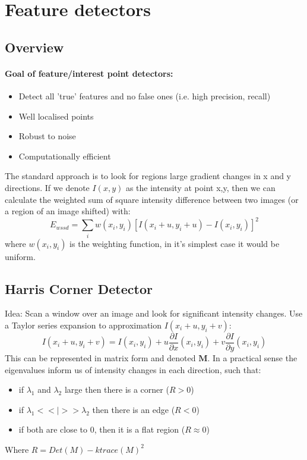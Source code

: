 \documentclass[]{article}
\begin{document}
\section{Feature detectors}
	\subsection{Overview}
	\paragraph{Goal of feature/interest point detectors:}
	\begin{itemize}
		\item Detect all 'true' features and no false ones (i.e. high precision, recall)
		\item Well localised points
		\item Robust to noise
		\item Computationally efficient
	\end{itemize}
	\textnormal{The standard approach is to look for regions large gradient changes in x and y directions. If we denote $I(x, y)$ as the intensity at point x,y, then we can calculate the weighted sum of square intensity difference between two images (or a region of an image shifted) with:}
	$$E_{wssd} = \sum_i w(x_i, y_i) [I(x_i+u, y_i+u) - I(x_i, y_i)]^2$$
	\textnormal{where $w(x_i, y_i)$ is the weighting function, in it's simplest case it would be uniform.}
	
	\subsection{Harris Corner Detector}
		\textnormal{Idea: Scan a window over an image and look for significant intensity changes. Use a Taylor series expansion to approximation $I(x_i+u, y_i+v)$: }
		$$I(x_i+u, y_i+v) = I(x_i,y_i) + u\frac{\partial I}{\partial x} (x_i, y_i) + v\frac{\partial I}{\partial y} (x_i, y_i) $$
		\textnormal{This can be represented in matrix form and denoted $\textbf{M}$. In a practical sense the eigenvalues inform us of intensity changes in each direction, such that:}
		\begin{itemize}
			\item if $\lambda_1$ and $\lambda_2$ large then there is a corner  ($ R > 0$)
			\item if $\lambda_1 << | >> \lambda_2$ then there is an edge  ($ R < 0$) 
			\item if both are close to 0, then it is a flat region   ($ R \approx 0$)
		\end{itemize}
		\textnormal{Where $R = Det(M) - ktrace(M)^2$}
\end{document}
